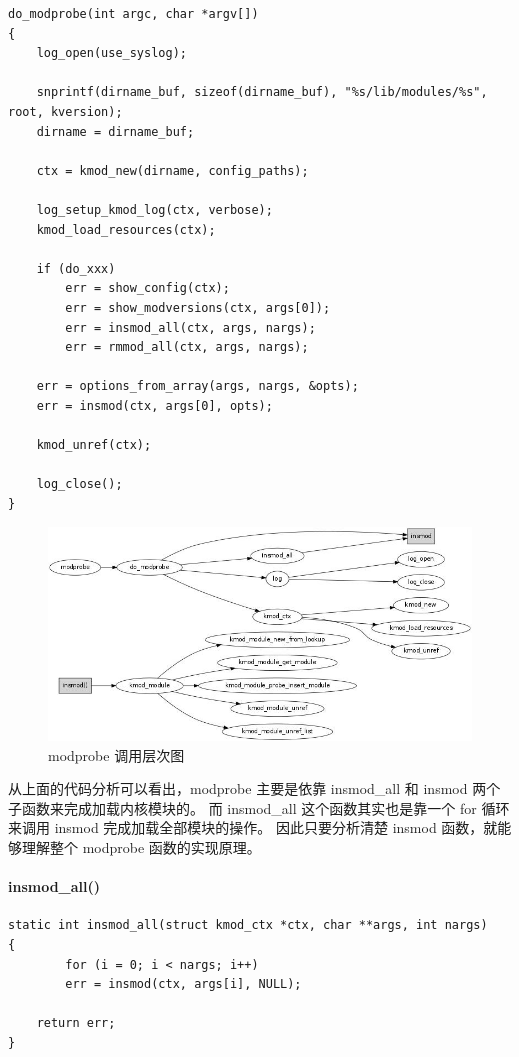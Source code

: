 \documentclass[11pt,a4paper]{article}
\makeatletter
\def\maxwidth{\ifdim\Gin@nat@width>\linewidth\linewidth
\else\Gin@nat@width\fi}
\let\Oldincludegraphics\includegraphics
\renewcommand{\includegraphics}[1]{\Oldincludegraphics[width=\maxwidth]{#1}}
\makeatother
\begin{document}
{\begin{shaded}\begin{verbatim}
do_modprobe(int argc, char *argv[])
{
    log_open(use_syslog);

    snprintf(dirname_buf, sizeof(dirname_buf), "%s/lib/modules/%s", root, kversion);
    dirname = dirname_buf;

    ctx = kmod_new(dirname, config_paths);

    log_setup_kmod_log(ctx, verbose);
    kmod_load_resources(ctx);

    if (do_xxx)
        err = show_config(ctx); 
        err = show_modversions(ctx, args[0]);
        err = insmod_all(ctx, args, nargs);
        err = rmmod_all(ctx, args, nargs); 

    err = options_from_array(args, nargs, &opts);
    err = insmod(ctx, args[0], opts);

    kmod_unref(ctx);

    log_close();
}
\end{verbatim}\end{shaded}}
\begin{figure}[htbp]
\centering
\includegraphics{./figures/modprobe.jpg}
\caption{modprobe 调用层次图}
\end{figure}

从上面的代码分析可以看出，modprobe 主要是依靠 insmod\_all 和 insmod
两个子函数来完成加载内核模块的。 而 insmod\_all 这个函数其实也是靠一个
for 循环来调用 insmod 完成加载全部模块的操作。 因此只要分析清楚 insmod
函数，就能够理解整个 modprobe 函数的实现原理。

\paragraph{insmod\_all()}

{\begin{shaded}\begin{verbatim}
static int insmod_all(struct kmod_ctx *ctx, char **args, int nargs)
{
        for (i = 0; i < nargs; i++) 
        err = insmod(ctx, args[i], NULL);

    return err;
}
\end{verbatim}\end{shaded}}
\end{document}
